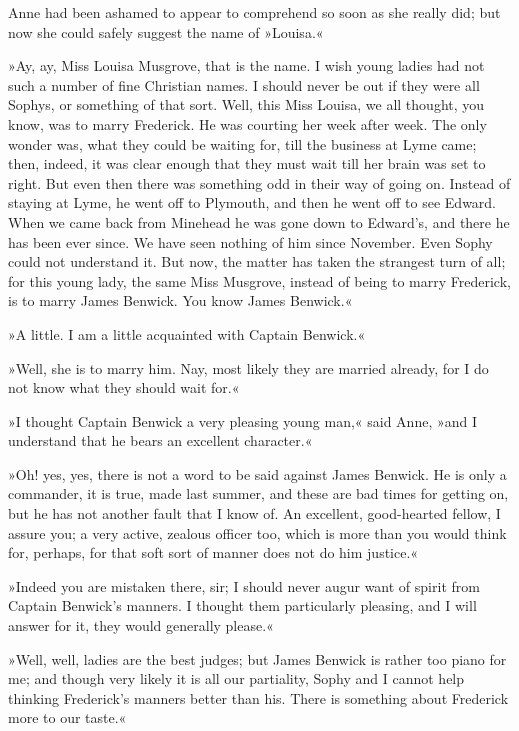 Anne had been ashamed to appear to comprehend so soon as she really did; but now she could safely suggest the name of »Louisa.«

»Ay, ay, Miss Louisa Musgrove, that is the name. I wish young ladies had not such a number of fine Christian names. I should never be out if they were all Sophys, or something of that sort. Well, this Miss Louisa, we all thought, you know, was to marry Frederick. He was courting her week after week. The only wonder was, what they could be waiting for, till the business at Lyme came; then, indeed, it was clear enough that they must wait till her brain was set to right. But even then there was something odd in their way of going on. Instead of staying at Lyme, he went off to Plymouth, and then he went off to see Edward. When we came back from Minehead he was gone down to Edward's, and there he has been ever since. We have seen nothing of him since November. Even Sophy could not understand it. But now, the matter has taken the strangest turn of all; for this young lady, the same Miss Musgrove, instead of being to marry Frederick, is to marry James Benwick. You know James Benwick.«

»A little. I am a little acquainted with Captain Benwick.«

»Well, she is to marry him. Nay, most likely they are married already, for I do not know what they should wait for.«

»I thought Captain Benwick a very pleasing young man,« said Anne, »and I understand that he bears an excellent character.«

»Oh! yes, yes, there is not a word to be said against James Benwick. He is only a commander, it is true, made last summer, and these are bad times for getting on, but he has not another fault that I know of. An excellent, good-hearted fellow, I assure you; a very active, zealous officer too, which is more than you would think for, perhaps, for that soft sort of manner does not do him justice.«

»Indeed you are mistaken there, sir; I should never augur want of spirit from Captain Benwick's manners. I thought them particularly pleasing, and I will answer for it, they would generally please.«

»Well, well, ladies are the best judges; but James Benwick is rather too piano for me; and though very likely it is all our partiality, Sophy and I cannot help thinking Frederick's manners better than his. There is something about Frederick more to our taste.«

